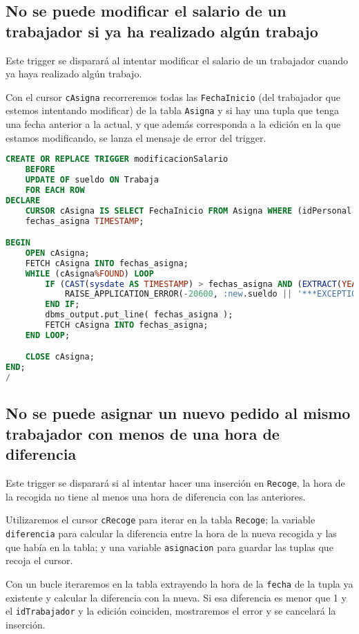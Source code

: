 \subsection{No se puede modificar el salario de un trabajador si ya ha realizado algún trabajo}
Este trigger se disparará al intentar modificar el salario de un trabajador
cuando ya haya realizado algún trabajo.

Con el cursor \texttt{cAsigna} recorreremos todas las \texttt{FechaInicio} (del
trabajador que estemos intentando modificar) de la tabla \texttt{Asigna} y si
hay una tupla que tenga una fecha anterior a la actual, y que además corresponda
a la edición en la que estamos modificando, se lanza el mensaje de error del trigger.

\begin{lstlisting}[language=sql]
CREATE OR REPLACE TRIGGER modificacionSalario
	BEFORE
	UPDATE OF sueldo ON Trabaja
	FOR EACH ROW
DECLARE
	CURSOR cAsigna IS SELECT FechaInicio FROM Asigna WHERE (idPersonal = :new.idPersonal);
	fechas_asigna TIMESTAMP;

BEGIN
	OPEN cAsigna;
	FETCH cAsigna INTO fechas_asigna;
	WHILE (cAsigna%FOUND) LOOP
		IF (CAST(sysdate AS TIMESTAMP) > fechas_asigna AND (EXTRACT(YEAR FROM fechas_asigna) >= :new.Año)) THEN
			RAISE_APPLICATION_ERROR(-20600, :new.sueldo || '***EXCEPTION**** No se puede modificar el sueldo ya que ya ha empezado su trabajo');
		END IF;
		dbms_output.put_line( fechas_asigna );
		FETCH cAsigna INTO fechas_asigna;
	END LOOP;

	CLOSE cAsigna;
END;
/
\end{lstlisting}

\pagebreak

\subsection{No se puede asignar un nuevo pedido al mismo trabajador con menos de una hora de diferencia}
Este trigger se disparará si al intentar hacer una inserción en \texttt{Recoge},
la hora de la recogida no tiene al menos una hora de diferencia con las
anteriores.

Utilizaremos el cursor \texttt{cRecoge} para iterar en la tabla \texttt{Recoge};
la variable \texttt{diferencia} para calcular la diferencia entre la hora de la
nueva recogida y las que había en la tabla; y una variable \texttt{asignacion}
para guardar las tuplas que recoja el cursor.

Con un bucle iteraremos en la tabla extrayendo la hora de la \texttt{fecha} de
la tupla ya existente y calcular la diferencia con la nueva. Si esa diferencia
es menor que 1 y el \texttt{idTrabajador} y la edición coinciden, mostraremos
el error y se cancelará la inserción.

